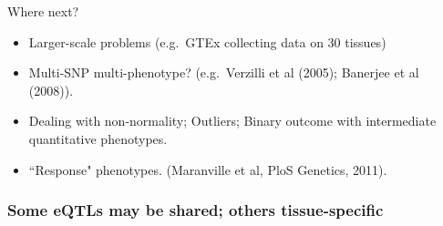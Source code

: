 \documentclass[ignorenonframetext]{beamer}
\begin{document}
\begin{frame}{Where next?}
\begin{itemize}
\item Larger-scale problems (e.g.~GTEx collecting data on 30 tissues)
\item Multi-SNP multi-phenotype? (e.g.~Verzilli et al (2005); Banerjee et al (2008)).
\item Dealing with non-normality; Outliers; Binary outcome with intermediate quantitative phenotypes.
\item ``Response" phenotypes. (Maranville et al, PloS Genetics, 2011).
\end{itemize}
\end{frame}



\begin{frame}
\frametitle{Some eQTLs may be shared; others tissue-specific}
\end{frame}


  
\end{document}
